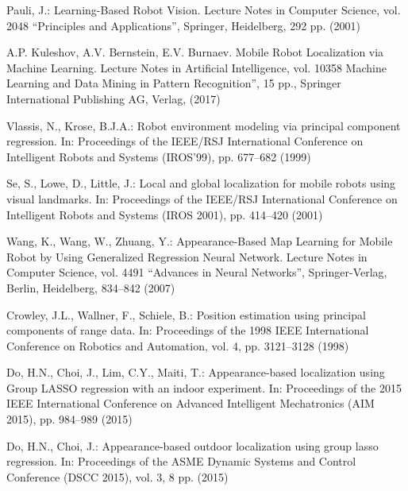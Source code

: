 \documentclass[conference]{IEEEtran} %
\begin{document}
\begin{thebibliography}{100}
Pauli, J.: Learning-Based Robot Vision. Lecture Notes in Computer Science, vol. 2048 ``Principles and Applications'', Springer, Heidelberg, 292 pp. (2001)

A.P. Kuleshov, A.V. Bernstein, E.V. Burnaev. Mobile Robot Localization via Machine Learning. Lecture Notes in Artificial Intelligence, vol. 10358 Machine Learning and Data Mining in Pattern Recognition”, 15 pp., Springer International Publishing AG, Verlag, (2017)

Vlassis, N., Krose, B.J.A.: Robot environment modeling via principal component regression. In: Proceedings of the IEEE/RSJ International Conference on Intelligent Robots and Systems (IROS'99), pp. 677--682 (1999)

Se, S., Lowe, D., Little, J.: Local and global localization for mobile robots using visual landmarks. In: Proceedings of the IEEE/RSJ International Conference on Intelligent Robots and Systems (IROS 2001), pp. 414--420 (2001)

Wang, K., Wang, W., Zhuang, Y.: Appearance-Based Map Learning for Mobile Robot by Using Generalized Regression Neural Network. Lecture Notes in Computer Science, vol. 4491 ``Advances in Neural Networks'', Springer-Verlag, Berlin, Heidelberg, 834--842 (2007)

Crowley, J.L., Wallner, F., Schiele, B.: Position estimation using principal components of range data. In: Proceedings of the 1998 IEEE International Conference on Robotics and Automation, vol. 4, pp. 3121--3128 (1998)

Do, H.N., Choi, J., Lim, C.Y., Maiti, T.: Appearance-based localization using Group LASSO regression with an indoor experiment. In: Proceedings of the 2015 IEEE International Conference on Advanced Intelligent Mechatronics (AIM 2015), pp. 984--989 (2015)

Do, H.N., Choi, J.: Appearance-based outdoor localization using group lasso regression. In: Proceedings of the ASME Dynamic Systems and Control Conference (DSCC 2015), vol. 3, 8 pp. (2015)


\end{thebibliography}
\end{document}
